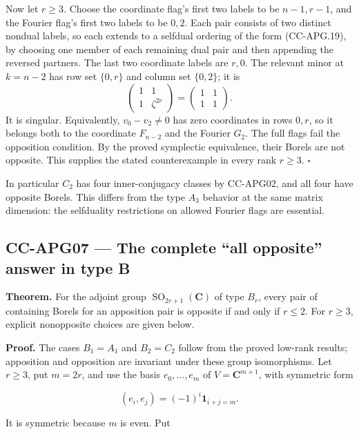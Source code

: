 \documentclass[11pt,a4paper]{article}
\theoremstyle{definition}\newtheorem{definition}[theorem]{Definition}
\theoremstyle{remark}\newtheorem{remark}[theorem]{Remark}
\begin{document}
Now let \(r\geq3\). Choose the coordinate flag's first two labels to be
\(n-1,r-1\), and the Fourier flag's first two labels to be \(0,2\). Each
pair consists of two distinct nondual labels, so each extends to a
selfdual ordering of the form (CC-APG.19), by choosing one member of
each remaining dual pair and then appending the reversed partners. The
last two coordinate labels are \(r,0\). The relevant minor at \(k=n-2\)
has row set \(\{0,r\}\) and column set \(\{0,2\}\); it is \[
 \begin{pmatrix}1&1\\1&\zeta^{2r}\end{pmatrix}
 =\begin{pmatrix}1&1\\1&1\end{pmatrix}.
\] It is singular. Equivalently, \(v_0-v_2\ne0\) has zero coordinates in
rows \(0,r\), so it belongs both to the coordinate \(F_{n-2}\) and the
Fourier \(G_2\). The full flags fail the opposition condition. By the
proved symplectic equivalence, their Borels are not opposite. This
supplies the stated counterexample in every rank \(r\geq3\). \(\square\)

In particular \(C_2\) has four inner-conjugacy classes by CC-APG02, and
all four have opposite Borels. This differs from the type \(A_3\)
behavior at the same matrix dimension: the selfduality restrictions on
allowed Fourier flags are essential.

\subsection{CC-APG07 --- The complete ``all opposite'' answer in type
B}\label{cc-apg07-the-complete-all-opposite-answer-in-type-b}

\textbf{Theorem.} For the adjoint group
\(\operatorname{SO}_{2r+1}(\mathbf C)\) of type \(B_r\), every pair of
containing Borels for an apposition pair is opposite if and only if
\(r\leq2\). For \(r\geq3\), explicit nonopposite choices are given
below.

\textbf{Proof.} The cases \(B_1=A_1\) and \(B_2=C_2\) follow from the
proved low-rank results; apposition and opposition are invariant under
these group isomorphisms. Let \(r\geq3\), put \(m=2r\), and use the
basis \(e_0,\ldots,e_m\) of \(V=\mathbf C^{m+1}\), with symmetric form

\[
 (e_i,e_j)=(-1)^i\mathbf 1_{i+j=m}.
 \tag{CC-APG.20}
\]

It is symmetric because \(m\) is even. Put
\end{document}
